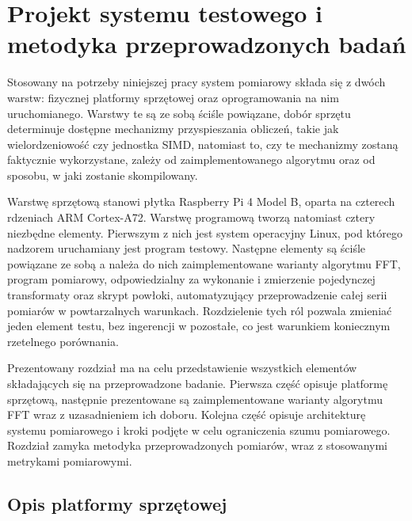 \chapter{Projekt systemu testowego i metodyka przeprowadzonych badań}\label{}
Stosowany na potrzeby niniejszej pracy system pomiarowy składa się z dwóch
warstw: fizycznej platformy sprzętowej oraz oprogramowania na nim uruchomianego.
Warstwy te są ze sobą ściśle powiązane, dobór sprzętu
determinuje dostępne mechanizmy przyspieszania obliczeń, takie jak
wielordzeniowość czy jednostka SIMD, natomiast to, czy te mechanizmy zostaną
faktycznie wykorzystane, zależy od zaimplementowanego algorytmu oraz od
sposobu, w jaki zostanie skompilowany.

Warstwę sprzętową stanowi płytka Raspberry Pi 4 Model B, oparta na czterech
rdzeniach ARM Cortex-A72. Warstwę programową tworzą
natomiast cztery niezbędne elementy. Pierwszym z nich jest system operacyjny Linux, pod
którego nadzorem uruchamiany jest program testowy. Następne elementy są ściśle powiązane ze sobą
a należa do nich zaimplementowane warianty
algorytmu FFT, program pomiarowy, odpowiedzialny
za wykonanie i zmierzenie pojedynczej transformaty oraz skrypt powłoki,
automatyzujący przeprowadzenie całej serii pomiarów w powtarzalnych
warunkach. Rozdzielenie tych ról pozwala zmieniać jeden element testu, bez ingerencji w pozostałe, co jest warunkiem
koniecznym rzetelnego porównania.

Prezentowany rozdział ma na celu przedstawienie wszystkich elementów
składających się na przeprowadzone badanie. Pierwsza część opisuje platformę
sprzętową, następnie prezentowane są zaimplementowane warianty algorytmu FFT wraz z uzasadnieniem
ich doboru. Kolejna część opisuje architekturę systemu pomiarowego i kroki
podjęte w celu ograniczenia szumu pomiarowego. Rozdział zamyka metodyka
przeprowadzonych pomiarów, wraz z stosowanymi metrykami pomiarowymi.
\section{Opis platformy sprzętowej}\label{section:PlatformaSprzetowa}

